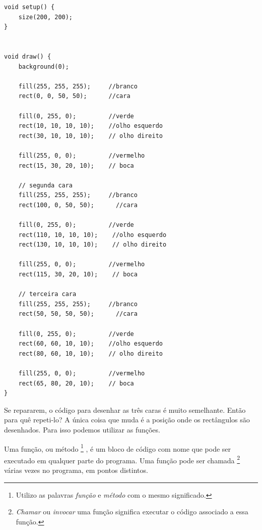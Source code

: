 \begin{lstlisting}
void setup() {
    size(200, 200);
}


void draw() {
    background(0);
    
    fill(255, 255, 255);     //branco
    rect(0, 0, 50, 50);      //cara
    
    fill(0, 255, 0);         //verde
    rect(10, 10, 10, 10);    //olho esquerdo
    rect(30, 10, 10, 10);    // olho direito
    
    fill(255, 0, 0);         //vermelho
    rect(15, 30, 20, 10);    // boca
    
    // segunda cara
    fill(255, 255, 255);     //branco
    rect(100, 0, 50, 50);      //cara
    
    fill(0, 255, 0);         //verde
    rect(110, 10, 10, 10);    //olho esquerdo
    rect(130, 10, 10, 10);    // olho direito
    
    fill(255, 0, 0);         //vermelho
    rect(115, 30, 20, 10);    // boca       
    
    // terceira cara
    fill(255, 255, 255);     //branco
    rect(50, 50, 50, 50);      //cara
    
    fill(0, 255, 0);         //verde
    rect(60, 60, 10, 10);    //olho esquerdo
    rect(80, 60, 10, 10);    // olho direito
    
    fill(255, 0, 0);         //vermelho
    rect(65, 80, 20, 10);    // boca           
}

\end{lstlisting}
Se repararem, o código para desenhar as três caras é muito semelhante. Então para quê repeti-lo? A única coisa que muda é a posição onde os rectângulos são desenhados. Para isso podemos utilizar as funções. 

Uma função, ou método%
\footnote{Utilizo as palavras \emph{função} e \emph{método} com o mesmo significado.}%
, é um bloco de código com nome que pode ser executado em qualquer parte do programa. Uma função pode ser chamada%
\footnote{\emph{Chamar} ou \emph{invocar} uma função significa executar o código associado a essa função.}
várias vezes no programa, em pontos distintos.

